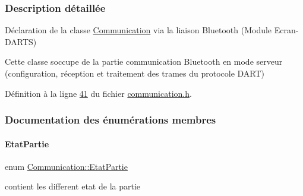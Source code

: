 \subsubsection{Description détaillée}
Déclaration de la classe \hyperlink{class_communication}{Communication} via la liaison Bluetooth (Module Ecran-\/\+D\+A\+R\+TS) 

Cette classe s\textquotesingle{}occupe de la partie communication Bluetooth en mode serveur (configuration, réception et traitement des trames du protocole D\+A\+RT) 

Définition à la ligne \hyperlink{communication_8h_source_l00041}{41} du fichier \hyperlink{communication_8h_source}{communication.\+h}.



\subsubsection{Documentation des énumérations membres}
\mbox{\label{class_communication_aaa8ce2e87a389c88f4f9a2f07b66ebdd}} 
\paragraph{\texorpdfstring{Etat\+Partie}{EtatPartie}}
{\footnotesize\ttfamily enum \hyperlink{class_communication_aaa8ce2e87a389c88f4f9a2f07b66ebdd}{Communication\+::\+Etat\+Partie}}



contient les different etat de la partie 

